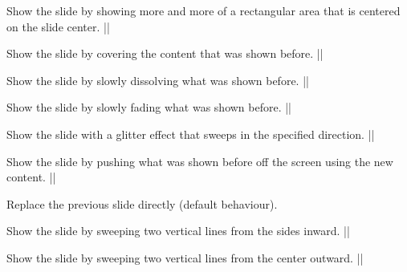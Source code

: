 \begin{command}{\transboxout{}}
  Show the slide by showing more and more of a rectangular area that is centered on the slide center.
  \example|\transboxout|
\end{command}

\begin{command}{\transcover{}}
  Show the slide by covering the content that was shown before.
  \example|\transcover|
\end{command}

\begin{command}{\transdissolve{}}
  Show the slide by slowly dissolving what was shown before.
  \example|\transdissolve[duration=0.2]|
\end{command}

\begin{command}{\transfade{}}
  Show the slide by slowly fading what was shown before.
  \example|\transfade|
\end{command}

\begin{command}{\transglitter{}}
  Show the slide with a glitter effect that sweeps in the specified direction.
  \example||
\end{command}

\begin{command}{\transpush{}}
  Show the slide by pushing what was shown before off the screen using
  the new content.
  \example|\transpush|
\end{command}

\begin{command}{\transreplace{}}
  Replace the previous slide directly (default behaviour).
\end{command}

\begin{command}{\transsplitverticalin{}}
  Show the slide by sweeping two vertical lines from the sides inward.
  \example|\transsplitverticalin|
\end{command}

\begin{command}{\transsplitverticalout{}}
  Show the slide by sweeping two vertical lines from the center outward.
  \example|\transsplitverticalout|
\end{command}

